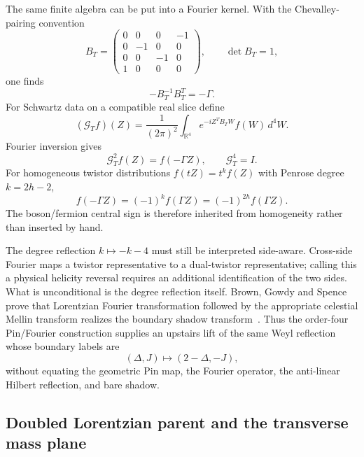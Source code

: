 \documentclass[11pt]{article}
\theoremstyle{definition}\newtheorem{definition}[theorem]{Definition}
\theoremstyle{remark}\newtheorem{remark}[theorem]{Remark}\newtheorem{conjecture}[theorem]{Conjecture}
\begin{document}
The same finite algebra can be put into a Fourier kernel. With the Chevalley-pairing convention
\begin{equation}
 B_T=
 \begin{pmatrix}
 0&0&0&-1\\
 0&-1&0&0\\
 0&0&-1&0\\
 1&0&0&0
 \end{pmatrix},
 \qquad \det B_T=1,
\end{equation}
one finds
\begin{equation}
 -B_T^{-1}B_T^T=-\Gamma.
\end{equation}
For Schwartz data on a compatible real slice define
\begin{equation}\label{eq:GTfourier}
 (\mathcal G_Tf)(Z)
 =
 \frac1{(2\pi)^2}\int_{\mathbb R^4}
 e^{-iZ^TB_TW}f(W)\,d^4W.
\end{equation}
Fourier inversion gives
\begin{equation}\label{eq:GTsquare}
 \boxed{\mathcal G_T^2f(Z)=f(-\Gamma Z),\qquad
 \mathcal G_T^4=I.}
\end{equation}
For homogeneous twistor distributions $f(tZ)=t^k f(Z)$ with Penrose degree
$k=2h-2$,
\begin{equation}
 f(-\Gamma Z)=(-1)^k f(\Gamma Z)=(-1)^{2h}f(\Gamma Z).
\end{equation}
The boson/fermion central sign is therefore inherited from homogeneity rather than inserted by hand.

The degree reflection $k\mapsto-k-4$ must still be interpreted side-aware. Cross-side Fourier maps a twistor representative to a dual-twistor representative; calling this a physical helicity reversal requires an additional identification of the two sides. What is unconditional is the degree reflection itself. Brown, Gowdy and Spence prove that Lorentzian Fourier transformation followed by the appropriate celestial Mellin transform realizes the boundary shadow transform~\cite{BrownGowdySpence2023}. Thus the order-four Pin/Fourier construction supplies an upstairs lift of the same Weyl reflection whose boundary labels are
\begin{equation}
 (\Delta,J)\longmapsto(2-\Delta,-J),
\end{equation}
without equating the geometric Pin map, the Fourier operator, the anti-linear Hilbert reflection, and bare shadow.


\subsection{Doubled Lorentzian parent and the transverse mass plane}
\end{document}
